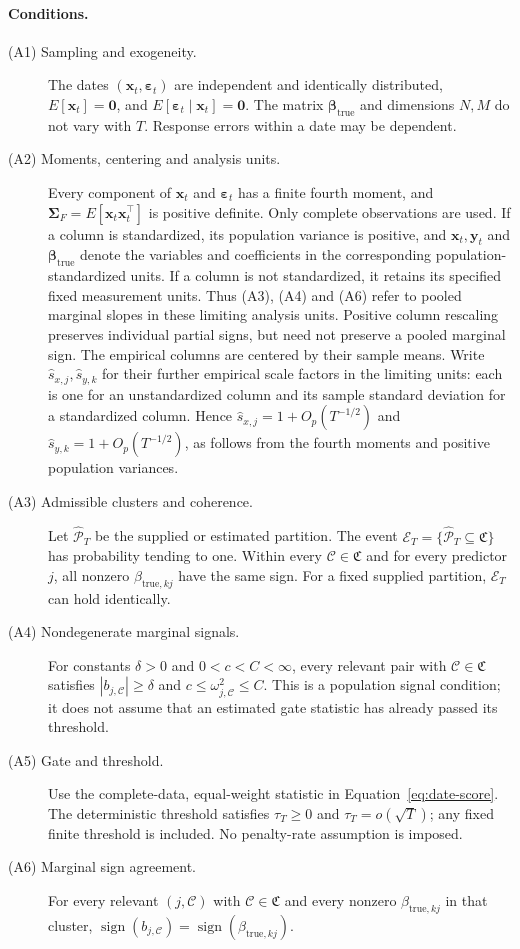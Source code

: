 \documentclass[11pt,a4paper]{article}
\begin{document}
\paragraph{Conditions.}
\begin{description}
 \item[(A1) Sampling and exogeneity.] The dates
 $(\bm x_t,\bm\varepsilon_t)$ are independent and identically distributed,
 $E[\bm x_t]=\bm0$, and
 $E[\bm\varepsilon_t\mid\bm x_t]=\bm0$. The matrix
 $\bm\beta_{\mathrm{true}}$ and dimensions $N,M$ do not vary with $T$.
 Response errors within a date may be dependent.
 \item[(A2) Moments, centering and analysis units.] Every component of
 $\bm x_t$ and $\bm\varepsilon_t$ has a finite fourth moment, and
 $\bm\Sigma_F=E[\bm x_t\bm x_t^\top]$ is positive definite.
 Only complete observations are used. If a column is standardized, its
 population variance is positive, and $\bm x_t,\bm y_t$ and
 $\bm\beta_{\mathrm{true}}$ denote the variables and coefficients in
 the corresponding population-standardized units. If a column is not
 standardized, it retains its specified fixed measurement units.
 Thus (A3), (A4) and (A6) refer to pooled marginal slopes in these limiting
 analysis units. Positive column rescaling preserves individual partial
 signs, but need not preserve a pooled marginal sign.
 The empirical columns are centered by their sample means. Write
 $\widehat s_{x,j},\widehat s_{y,k}$ for their further empirical scale
 factors in the limiting units: each is one for an unstandardized column
 and its sample standard deviation for a standardized column. Hence
 $\widehat s_{x,j}=1+O_p(T^{-1/2})$ and
 $\widehat s_{y,k}=1+O_p(T^{-1/2})$, as follows from the fourth moments
 and positive population variances.
 \item[(A3) Admissible clusters and coherence.] Let
 $\widehat{\mathcal P}_T$ be the supplied or estimated partition. The event
 $\mathcal E_T=\{\widehat{\mathcal P}_T\subseteq\mathfrak C\}$ has probability
 tending to one. Within every $\mathcal C\in\mathfrak C$ and for every
 predictor $j$, all nonzero $\beta_{\mathrm{true},kj}$ have the same sign.
 For a fixed supplied partition, $\mathcal E_T$ can hold identically.
 \item[(A4) Nondegenerate marginal signals.] For constants
 $\delta>0$ and $0<c<C<\infty$, every relevant pair with
 $\mathcal C\in\mathfrak C$ satisfies
 $|b_{j,\mathcal C}|\geq\delta$ and
 $c\leq\omega_{j,\mathcal C}^2\leq C$.
 This is a population signal condition; it does not assume that an estimated
 gate statistic has already passed its threshold.
 \item[(A5) Gate and threshold.] Use the complete-data, equal-weight statistic
 in Equation~\eqref{eq:date-score}. The deterministic threshold
 satisfies $\tau_T\geq0$ and $\tau_T=o(\sqrt T)$; any fixed finite threshold is
 included. No penalty-rate assumption is imposed.
 \item[(A6) Marginal sign agreement.] For every relevant
 $(j,\mathcal C)$ with $\mathcal C\in\mathfrak C$ and every nonzero
 $\beta_{\mathrm{true},kj}$ in that cluster,
 $\operatorname{sign}(b_{j,\mathcal C})
 =\operatorname{sign}(\beta_{\mathrm{true},kj})$.
\end{description}
\end{document}
